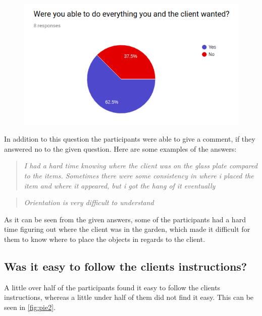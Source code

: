 \begin{figure}[H]
	\centering
	\includegraphics[width=0.9\linewidth]{figure/Evaluation/pie1.png}
	\caption{}
	\label{fig:pie1}
\end{figure}

In addition to this question the participants were able to give a comment, if they answered no to the given question. Here are some examples of the answers:\\

 \begin{quote}
 	
\textit{I had a hard time knowing where the client was on the glass plate compared to the items. Sometimes there were some consistency in where i placed the item and where it appeared, but i got the hang of it eventually}\\
  \end{quote}
  
  \begin{quote}
  \textit{Orientation is very difficult to understand}\\
  \end{quote}	
 	 
 	As it can be seen from the given answers, some of the participants had a hard time figuring out where the client was in the garden, which made it difficult for them to know where to place the objects in regards to the client.
 

\subsection*{Was it easy to follow the clients instructions?}
A little over half of the participants found it easy to follow the clients instructions, whereas a little under half of them did not find it easy. This can be seen in \autoref{fig:pie2}.

